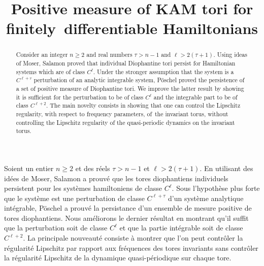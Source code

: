 \documentclass[JEP,XML,SOM,Unicode]{cedram}
\numberwithin{equation}{section}
\theoremstyle{plain}
\theoremstyle{definition}
\begin{document}
\frontmatter
\title{Positive measure of KAM tori for finitely~differentiable Hamiltonians}

\author[\initial{A.} \lastname{Bounemoura}]{ }
\address{CNRS - PSL Research University,
(Université Paris-Dauphine and Observatoire de Paris)\\
Place du Maréchal de Lattre de Tassigny
75775 Paris Cedex 16, France}

\begin{abstract}
Consider an integer $n \geq 2$ and real numbers $\tau>n-1$ and $\ell>2(\tau+1)$. Using ideas of Moser, Salamon proved that individual Diophantine tori persist for Hamiltonian systems which are of class $C^\ell$. Under the stronger assumption that the system is a $C^{\ell+\tau}$ perturbation of an analytic integrable system, Pöschel proved the persistence of a set of positive measure of Diophantine tori. We improve the latter result by showing it is sufficient for the perturbation to be of class $C^{\ell}$ and the integrable part to be of class $C^{\ell+2}$. The main novelty consists in showing that one can control the Lipschitz regularity, with respect to frequency parameters, of~the invariant torus, without controlling the Lipschitz regularity of the quasi-periodic dynamics on the invariant torus.
\end{abstract}





\begin{altabstract}
Soient un entier $n \geq 2$ et des réels $\tau>n-1$ et $\ell>2(\tau+1) $. En utilisant des idées de Moser, Salamon a prouvé que les tores diophantiens individuels persistent pour les systèmes hamiltoniens de classe $C^\ell$. Sous l'hypothèse plus forte que le système est une perturbation de classe $C^{\ell+\tau}$ d'un système analytique intégrable, Pöschel a prouvé la persistance d'un ensemble de mesure positive de tores diophantiens. Nous améliorons le dernier résultat en montrant qu'il suffit que la perturbation soit de classe $C^\ell$ et que la partie intégrable soit de classe $C^{\ell+2}$. La principale nouveauté consiste à montrer que l'on peut contrôler la régularité Lipschitz par rapport aux fréquences des tores invariants sans contrôler la régularité Lipschitz de la dynamique quasi-périodique sur chaque tore.
\end{altabstract}
\end{document}
